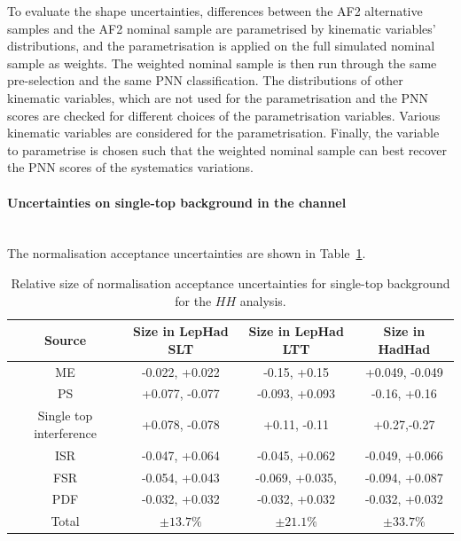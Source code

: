 To evaluate the shape uncertainties, differences between the AF2 alternative samples and the AF2 nominal sample 
are parametrised by kinematic variables' distributions, and the parametrisation is applied on the full simulated nominal 
sample as weights. The weighted nominal sample is then run through the same pre-selection and the same PNN 
classification. The distributions of other kinematic variables, which are not used for the parametrisation and the PNN scores 
are checked for different choices of the parametrisation variables.  Various kinematic variables are considered for the 
parametrisation. Finally, the variable to parametrise is chosen such that the weighted nominal sample can best recover 
the PNN scores of the systematics variations. 

\paragraph{Uncertainties on single-top background in the \lephad channel}\mbox{}\\

The normalisation acceptance uncertainties are shown in Table~\ref{sec:systs:tab:systematics_normalisations_singletop}.

\begin{table}
\centering
\small
\begin{tabular}{|c|c|c|c|}
\hline
Source & Size in LepHad SLT & Size in LepHad LTT & Size in HadHad \\
\hline
ME & -0.022, +0.022 & -0.15, +0.15 & +0.049, -0.049 \\  
PS & +0.077, -0.077 & -0.093, +0.093 & -0.16, +0.16 \\
Single top interference & +0.078, -0.078 & +0.11, -0.11 & +0.27,-0.27 \\
ISR & -0.047, +0.064 & -0.045, +0.062 & -0.049, +0.066 \\ 
FSR & -0.054, +0.043 & -0.069, +0.035, & -0.094, +0.087\\
PDF & -0.032, +0.032 & -0.032, +0.032 &  -0.032, +0.032 \\
Total & $\pm 13.7\%$ & $\pm 21.1\%$ & $\pm 33.7\%$  \\
\hline
\end{tabular}
\caption{Relative size of normalisation acceptance uncertainties for single-top background for the $HH$  analysis.}
\label{sec:systs:tab:systematics_normalisations_singletop}
\end{table}

